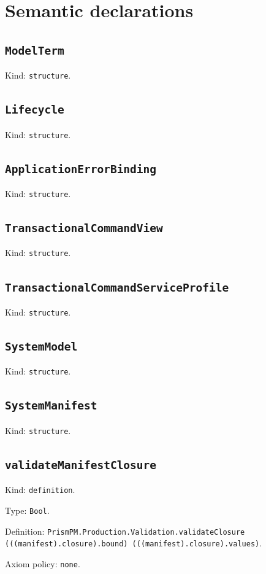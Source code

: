 \documentclass[11pt]{article}
\begin{document}
\section*{Semantic declarations}
\subsection*{\texttt{ModelTerm}}
\noindent Kind: \texttt{structure}.\par
\subsection*{\texttt{Lifecycle}}
\noindent Kind: \texttt{structure}.\par
\subsection*{\texttt{ApplicationErrorBinding}}
\noindent Kind: \texttt{structure}.\par
\subsection*{\texttt{TransactionalCommandView}}
\noindent Kind: \texttt{structure}.\par
\subsection*{\texttt{TransactionalCommandServiceProfile}}
\noindent Kind: \texttt{structure}.\par
\subsection*{\texttt{SystemModel}}
\noindent Kind: \texttt{structure}.\par
\subsection*{\texttt{SystemManifest}}
\noindent Kind: \texttt{structure}.\par
\subsection*{\texttt{validateManifestClosure}}
\noindent Kind: \texttt{definition}.\par
\noindent Type: \texttt{Bool}.\par
\noindent Definition: \texttt{PrismPM.Production.Validation.validateClosure (((manifest).closure).bound) (((manifest).closure).values)}.\par
\noindent Axiom policy: \texttt{none}.\par
\end{document}
